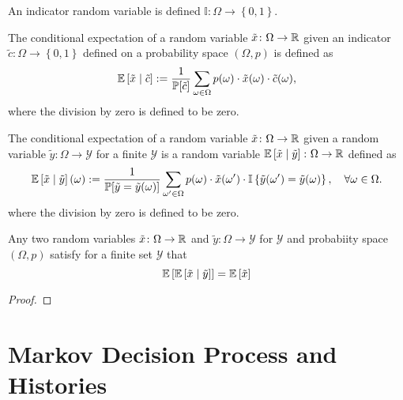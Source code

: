 \begin{definition}
  An indicator random variable is defined $\mathbb{I}\colon  \Omega \to \left\{ 0, 1 \right\}$.
  \leanok
\end{definition}

\begin{definition}
  The conditional expectation of a random variable $\tilde{x} \colon \Omega \to \mathbb{R}$ given an indicator $\tilde{c} \colon \Omega \to  \left\{ 0, 1  \right\}$ defined on a probability space $(\Omega, p)$ is defined as
  \[
    \mathbb{E} \left[ \tilde{x} \mid  \tilde{c} \right] := \frac{1}{\mathbb{P}[\tilde{c}]} \sum_{\omega \in \Omega } p(\omega ) \cdot \tilde{x}(\omega) \cdot \tilde{c}(\omega),
  \]
  where the division by zero is defined to be zero.
  \leanok
\end{definition}

\begin{definition}
  The conditional expectation of a random variable $\tilde{x} \colon \Omega \to \mathbb{R}$ given a random variable $\tilde{y} \colon \Omega \to \mathcal{Y}$ for a finite $\mathcal{Y}$ is a random variable $\mathbb{E} \left[ \tilde{x} \mid  \tilde{y} \right]\colon \Omega \to \mathbb{R}$  defined as
  \[
    \mathbb{E} \left[ \tilde{x} \mid  \tilde{y} \right](\omega) := \frac{1}{\mathbb{P}[\tilde{y} = \tilde{y}(\omega)]} \sum_{\omega' \in \Omega } p(\omega) \cdot \tilde{x}(\omega') \cdot \mathbb{I}\left\{ \tilde{y}(\omega') = \tilde{y}(\omega) \right\}, \quad \forall \omega \in \Omega.
  \]
  where the division by zero is defined to be zero.
  \leanok
\end{definition}

\begin{theorem}
Any two random variables $\tilde{x} \colon \Omega \to \mathbb{R}$ and $\tilde{y} \colon \Omega \to \mathcal{Y} $ for $\mathcal{Y}$ and probabiity space $(\Omega, p)$ satisfy for a finite set $\mathcal{Y}$ that
  \[
   \mathbb{E}\left[\mathbb{E}\left[\tilde{x} \mid  \tilde{y}\right]\right] = \mathbb{E} \left[ \tilde{x} \right] 
 \]
\end{theorem}
\begin{proof}
\end{proof}


\section{Markov Decision Process and Histories}

